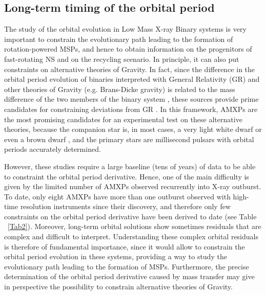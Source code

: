 \documentclass[graybox]{svmult}
\begin{document}
\subsection{Long-term timing of the orbital period}
The study of the orbital evolution in Low Mass X-ray Binary systems is very important to constrain the evolutionary path leading to the formation of rotation-powered MSPs, and hence to obtain information on the progenitors of fast-rotating NS and on the recycling scenario. In principle, it can also put constraints on alternative theories of Gravity. In fact, since the difference in the orbital period evolution of binaries interpreted with General Relativity (GR) and other theories of Gravity (e.g. Brans-Dicke gravity) is related to the mass difference of the two members of the binary system \cite{Will2006}, these sources provide prime candidates for constraining deviations from GR \cite{Psaltis2008}. In this framework, AMXPs are the most promising candidates for an experimental test on these alternative theories, because the companion star is, in most cases, a very light white dwarf or even a brown dwarf \cite{Bildsten2001}, and the primary stars are millisecond pulsars with orbital periods accurately determined. 
 
However, these studies require a large baseline (tens of years) of data to be able to constraint the orbital period derivative. Hence, one of the main difficulty is given by the limited number of AMXPs observed recurrently into X-ray outburst. To date, only eight AMXPs have more than one outburst observed with high-time resolution instruments since their discovery, and therefore only few constraints on the orbital period derivative have been derived to date (see Table ~\ref{Tab2}). Moreover, long-term orbital solutions show sometimes residuals that are complex and difficult to interpret. Understanding these complex orbital residuals is therefore of fundamental importance, since it would allow to constrain the orbital period evolution in these systems, providing a way to study the evolutionary path leading to the formation of MSPs. Furthermore, the precise determination of the orbital period derivative caused by mass transfer may give in perspective the possibility to constrain alternative theories of Gravity.
\end{document}
